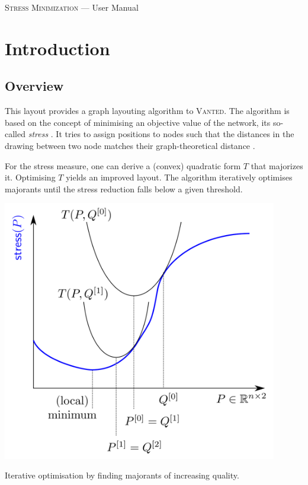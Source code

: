 \documentclass{tufte-handout}
\begin{document}
\textsc{Stress Minimization} --- User Manual

  \setlength{\parindent}{0em}
  \setlength{\parskip}{0.75em}

  \section{Introduction}
  \subsection{Overview}
  This layout provides a graph layouting algorithm to \textsc{Vanted}. The
  algorithm is based on the concept of minimising an objective value of the
  network, its so-called \textit{stress}
  .
  It tries to assign positions to nodes
  such that the distances in the drawing between two node matches their
  graph-theoretical distance .

  For the stress measure, one can derive a (convex) quadratic form $T$ that majorizes
  it. Optimising $T$ yields an improved layout. The algorithm iteratively
  optimises majorants until the stress reduction falls below a given threshold.
  \begin{marginfigure}
    \centering
    \includegraphics[width=0.9\textwidth]{iterative-optimisation}
    \caption{Iterative optimisation by finding majorants of increasing quality.}
  \end{marginfigure} 
\end{document}
